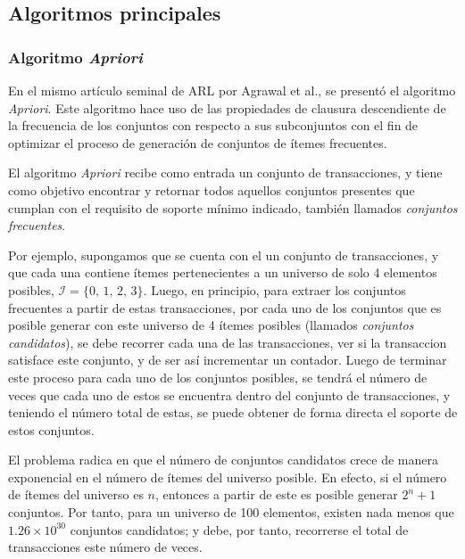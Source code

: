 \subsection{Algoritmos principales}

\subsubsection{Algoritmo \textit{Apriori}}

En el mismo artículo seminal de ARL por Agrawal et al.\cite{agrawal1993mining}, se presentó el algoritmo \textit{Apriori}. Este algoritmo hace uso de las propiedades de clausura descendiente de la frecuencia de los conjuntos con respecto a sus subconjuntos con el fin de optimizar el proceso de generación de conjuntos de ítemes frecuentes.

El algoritmo \textit{Apriori} recibe como entrada un conjunto de transacciones, y tiene como objetivo encontrar y retornar todos aquellos conjuntos presentes que cumplan con el requisito de soporte mínimo indicado, también llamados \textit{conjuntos frecuentes}.

Por ejemplo, supongamos que se cuenta con el un conjunto de transacciones, y que cada una contiene ítemes pertenecientes a un universo de solo 4 elementos posibles, $\mathcal{I} = \{0,\,1,\,2,\,3\}$. Luego, en principio, para extraer los conjuntos frecuentes a partir de estas transacciones, por cada uno de los conjuntos que es posible generar con este universo de 4 ítemes posibles (llamados \textit{conjuntos candidatos}), se debe recorrer cada una de las transacciones, ver si la transaccion satisface este conjunto, y de ser así incrementar un contador. Luego de terminar este proceso para cada uno de los conjuntos posibles, se tendrá el número de veces que cada uno de estos se encuentra dentro del conjunto de transacciones, y teniendo el número total de estas, se puede obtener de forma directa el soporte de estos conjuntos.


El problema radica en que el número de conjuntos candidatos crece de manera exponencial en el número de ítemes del universo posible. En efecto, si el número de ítemes del universo es $n$, entonces a partir de este es posible generar $2^n+1$ conjuntos. Por tanto, para un universo de 100 elementos, existen nada menos que $1.26\times10^{30}$ conjuntos candidatos; y debe, por tanto, recorrerse el total de transacciones este número de veces.


